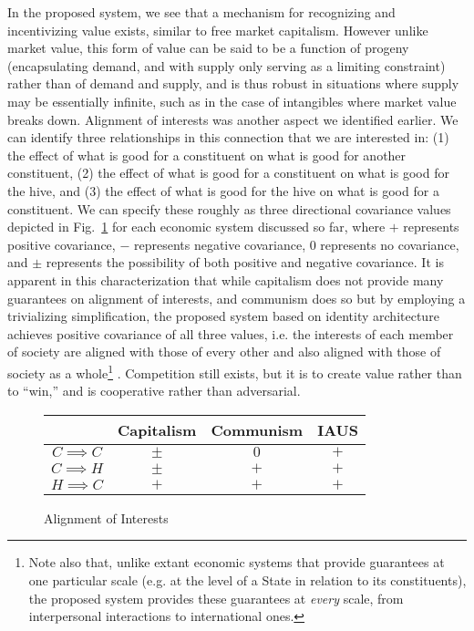 \documentclass[pra,twocolumn,groupedaddress,10pt]{revtex4}
\theoremstyle{definition}
\begin{document}
In the proposed system, we see that a mechanism for recognizing and incentivizing value exists, similar to free market capitalism. However unlike market value, this form of value can be said to be a function of progeny (encapsulating demand, and with supply only serving as a limiting constraint) rather than of demand and supply, and is thus robust in situations where supply may be essentially infinite, such as in the case of intangibles where market value breaks down. Alignment of interests was another aspect we identified earlier. We can identify three relationships in this connection that we are interested in: (1) the effect of what is good for a constituent on what is good for another constituent, (2) the effect of what is good for a constituent on what is good for the hive, and (3) the effect of what is good for the hive on what is good for a constituent. We can specify these roughly as three directional covariance values depicted in Fig.~\ref{fig:alignment} for each economic system discussed so far, where $+$ represents positive covariance, $-$ represents negative covariance, $0$ represents no covariance, and $\pm$ represents the possibility of both positive and negative covariance. It is apparent in this characterization that while capitalism does not provide many guarantees on alignment of interests, and communism does so but by employing a trivializing simplification, the proposed system based on identity architecture achieves positive covariance of all three values, i.e. the interests of each member of society are aligned with those of every other and also aligned with those of society as a whole\footnote{Note also that, unlike extant economic systems that provide guarantees at one particular scale (e.g. at the level of a State in relation to its constituents), the proposed system provides these guarantees at \textit{every} scale, from interpersonal interactions to international ones.} . Competition still exists, but it is to create value rather than to ``win,'' and is cooperative rather than adversarial.

\begin{figure}[htp]
	\begin{center}
		\begin{tabular}{ c | c | c | c }
			  & Capitalism & Communism & IAUS \\ \hline
			$C \implies C$ & $\pm$ & $0$ & $+$ \\
			$C \implies H$ & $\pm$ & $+$ & $+$ \\
			$H \implies C$ & $+$ & $+$ & $+$ \\
		\end{tabular}
	\end{center}
	\caption{\label{fig:alignment}Alignment of Interests}
\end{figure}
\end{document}
